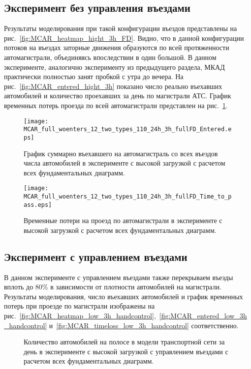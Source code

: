 \subsection{Эксперимент без управления въездами}
Результаты моделирования при такой конфигурации въездов представлены на рис.~\ref{fig:MCAR_heatmap_hight_3h_FD}.
Видно, что в данной конфигурации потоков на въездах заторные движения образуются по всей протяженности автомагистрали, объединяясь впоследствии в один большой.
В данном эксперименте, аналогично эксперименту из предыдущего раздела, МКАД практически полностью занят пробкой с утра до вечера.
На рис.~\ref{fig:MCAR_entered_hight_3h} показано число реально въехавших автомобилей и количество проехавших за день по магистрали АТС.
График временных потерь проезда по всей автомагистрали представлен на рис.~\ref{fig:MCAR_timeloss_hight_3h_FD}.

\begin{figure}[ht]
    \begin{minipage}[b][][b]{0.49\textwidth}
        \centering
        \texttt{[image: MCAR\_full\_woenters\_12\_two\_types\_110\_24h\_3h\_fullFD\_Entered.eps]}
        \caption{График суммарно въехавшего на автомагистраль со всех въездов числа автомобилей в эксперименте с высокой загрузкой с расчетом всех фундаментальных диаграмм.}
        \label{fig:MCAR_entered_hight_3h_FD}
    \end{minipage}
    \hfill
    \begin{minipage}[b][][b]{0.49\textwidth}
        \centering
        \texttt{[image: MCAR\_full\_woenters\_12\_two\_types\_110\_24h\_3h\_fullFD\_Time\_to\_pass.eps]}
        \caption{Временные потери на проезд по автомагистрали в эксперименте с высокой загрузкой с расчетом всех фундаментальных диаграмм.}
        \label{fig:MCAR_timeloss_hight_3h_FD}
    \end{minipage}
\end{figure}


\subsection{Эксперимент с управлением въездами}
В данном эксперименте с управлением въездами также перекрываем въезды вплоть до 80\% в зависимости от плотности автомобилей на магистрали.
Результаты моделирования, число въехавших автомобилей и график временных потерь при проезде по магистрали изображены на рис.~\ref{fig:MCAR_heatmap_low_3h_handcontrol},~\ref{fig:MCAR_entered_low_3h_handcontrol} и~\ref{fig:MCAR_timeloss_low_3h_handcontrol} соответственно.
\begin{figure}[ht]
    \caption{Количество автомобилей на полосе в модели транспортной сети за день в эксперименте с высокой загрузкой с управлением въездами с расчетом всех фундаментальных диаграмм.}
    \label{fig:MCAR_heatmap_hight_3h_handcontrol_FD}
\end{figure}

